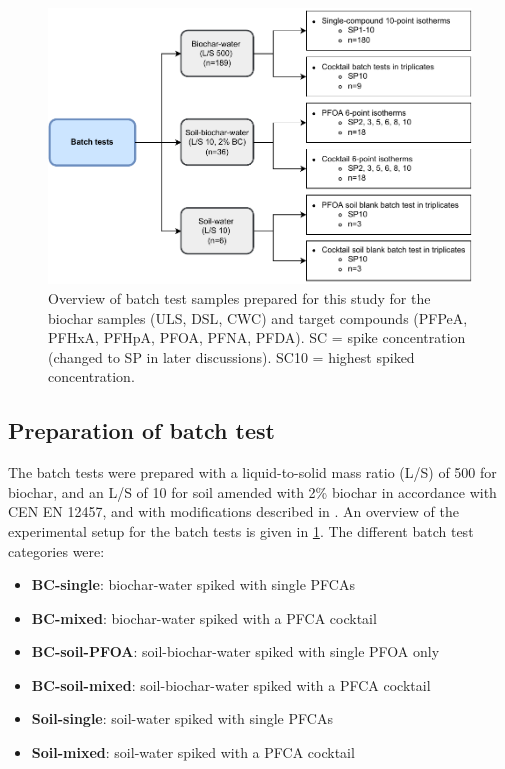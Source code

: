 \begin{figure}[tb]
    \centering
    \includegraphics{Diagrams/Methods-Page-9.pdf}
    \caption{Overview of batch test samples prepared for this study for the biochar samples (\acrshort{ULS}, \acrshort{DSL}, \acrshort{CWC}) and target compounds (\acrshort{PFPeA}, \acrshort{PFHxA}, \acrshort{PFHpA}, \acrshort{PFOA}, \acrshort{PFNA}, \acrshort{PFDA}). \acrshort{SC} = spike concentration (changed to SP in later discussions). SC10 = highest spiked concentration.}
    \label{fig:batchtests_flowchart}
\end{figure}

\subsection{Preparation of batch test}

The batch tests were prepared with a liquid-to-solid mass ratio (L/S) of 500 for biochar, and an L/S of 10 for soil amended with 2\% biochar in accordance with CEN EN 12457, and with modifications described in \citep{Hale2017fire, kupryianchyk2016biochar}. An overview of the experimental setup for the batch tests is given in \cref{fig:batchtests_flowchart}. The different batch test categories were:

\begin{itemize}
    \item \textbf{BC-single}: biochar-water spiked with single PFCAs
    \item \textbf{BC-mixed}: biochar-water spiked with a PFCA cocktail
    \item \textbf{BC-soil-PFOA}: soil-biochar-water spiked with single PFOA only
    \item \textbf{BC-soil-mixed}: soil-biochar-water spiked with a PFCA cocktail
    \item \textbf{Soil-single}: soil-water spiked with single PFCAs
    \item \textbf{Soil-mixed}: soil-water spiked with a PFCA cocktail
\end{itemize}

